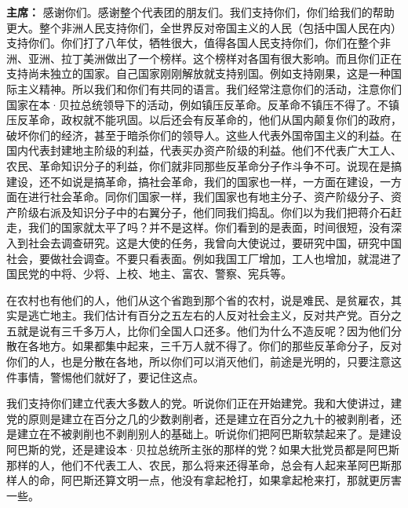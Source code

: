 \begin{list}{}
\item[\textbf{主席：}] 感谢你们。感谢整个代表团的朋友们。我们支持你们，你们给我们的帮助更大。整个非洲人民支持你们，全世界反对帝国主义的人民（包括中国人民在内）支持你们。你们打了八年仗，牺牲很大，值得各国人民支持你们，你们在整个非洲、亚洲、拉丁美洲做出了一个榜样。这个榜样对各国有很大影响。而且你们正在支持尚未独立的国家。自己国家刚刚解放就支持别国。例如支持刚果，这是一种国际主义精神。所以我们和你们有共同的语言。我们经常注意你们的活动，注意你们国家在本·贝拉总统领导下的活动，例如镇压反革命。反革命不镇压不得了。不镇压反革命，政权就不能巩固。以后还会有反革命的，他们从国内颠复你们的政府，破坏你们的经济，甚至于暗杀你们的领导人。这些人代表外国帝国主义的利益。在国内代表封建地主阶级的利益，代表买办资产阶级的利益。他们不代表广大工人、农民、革命知识分子的利益，你们就非同那些反革命分子作斗争不可。说现在是搞建设，还不如说是搞革命，搞社会革命，我们的国家也一样，一方面在建设，一方面在进行社会革命。同你们国家一样，我们国家也有地主分子、资产阶级分子、资产阶级右派及知识分子中的右翼分子，他们同我们捣乱。你们以为我们把蒋介石赶走，我们的国家就太平了吗？并不是这样。你们看到的是表面，时间很短，没有深入到社会去调查研究。这是大使的任务，我曾向大使说过，要研究中国，研究中国社会，要做社会调查。不要只看表面。例如我国工厂增加，工人也增加，就混进了国民党的中将、少将、上校、地主、富农、警察、宪兵等。

在农村也有他们的人，他们从这个省跑到那个省的农村，说是难民、是贫雇农，其实是逃亡地主。我们估计有百分之五左右的人反对社会主义，反对共产党。百分之五就是说有三千多万人，比你们全国人口还多。他们为什么不造反呢？因为他们分散在各地方。如果都集中起来，三千万人就不得了。你们的那些反革命分子，反对你们的人，也是分散在各地，所以你们可以消灭他们，前途是光明的，只要注意这件事情，警惕他们就好了，要记住这点。

我们支持你们建立代表大多数人的党。听说你们正在开始建党。我和大使讲过，建党的原则是建立在百分之几的少数剥削者，还是建立在百分之九十的被剥削者，还是建立在不被剥削也不剥削别人的基础上。听说你们把阿巴斯软禁起来了。是建设阿巴斯的党，还是建设本·贝拉总统所主张的那样的党？如果大批党员都是阿巴斯那样的人，他们不代表工人、农民，那么将来还得革命，总会有人起来革阿巴斯那样人的命，阿巴斯还算文明一点，他没有拿起枪打，如果拿起枪来打，那就更厉害一些。


\end{list}
